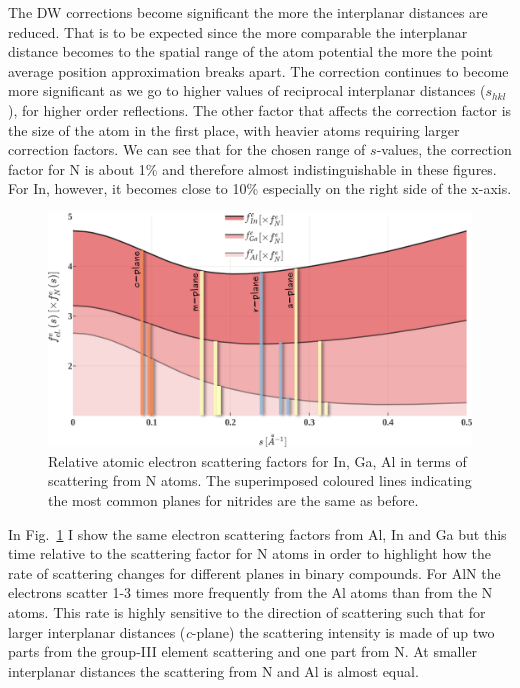 The DW corrections become significant the more the interplanar distances are reduced. That is to be expected since the more comparable the interplanar distance becomes to the spatial range of the atom potential the more the point average position approximation breaks apart. The correction continues to become more significant as we go to higher values of reciprocal interplanar distances ($s_{hkl}$), \eg for higher order reflections. The other factor that affects the correction factor is the size of the atom in the first place, with heavier atoms requiring larger correction factors. We can see that for the chosen range of $s$-values, the correction factor for N is about 1\% and therefore almost indistinguishable in  these figures. For In, however, it becomes close to 10\% especially on the right side of the x-axis. 



\begin{figure}
    \centering
\includegraphics[width=1\linewidth]{Figures/scatterFactor_eRel.png}
\caption[Relative atomic electron scattering factors.]{Relative atomic electron scattering factors for In, Ga, Al in terms of scattering from N atoms. The superimposed coloured lines indicating the most common planes for nitrides are the same as before. }
\label{Fig:scatterFactor_eRel}
\end{figure}

In Fig.~\ref{Fig:scatterFactor_eRel} I show the same electron scattering factors from Al, In and Ga but this time relative to the scattering factor for N atoms in order to highlight how the rate of scattering changes for different planes in binary compounds. For AlN the electrons scatter 1-3 times more frequently from the Al atoms than from the N atoms. This rate is highly sensitive to the direction of scattering such that for larger interplanar distances (\textit{c}-plane) the scattering intensity is made of up two parts from the group-III element scattering and one part from N. At smaller interplanar distances the scattering from N and Al is almost equal. 


